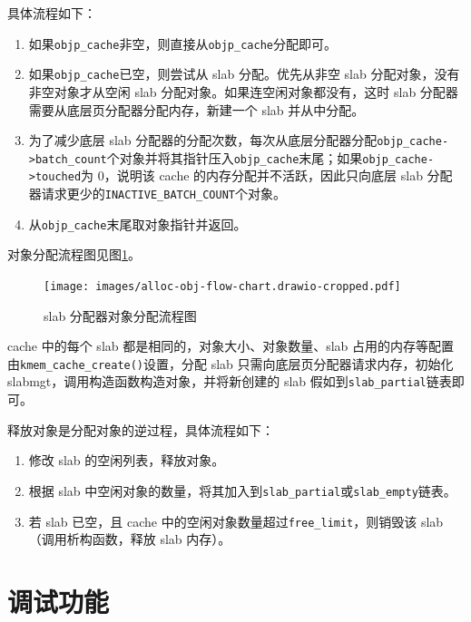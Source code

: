 \documentclass[AutoFakeBold]{LZUThesis}
\begin{document}
\begin{sloppypar}
具体流程如下：

\begin{enumerate}
\def\labelenumi{\arabic{enumi}.}
\item
  如果\texttt{objp\_cache}非空，则直接从\texttt{objp\_cache}分配即可。
\item
  如果\texttt{objp\_cache}已空，则尝试从 slab 分配。优先从非空 slab
  分配对象，没有非空对象才从空闲 slab
  分配对象。如果连空闲对象都没有，这时 slab
  分配器需要从底层页分配器分配内存，新建一个 slab 并从中分配。
\item
  为了减少底层 slab
  分配器的分配次数，每次从底层分配器分配\texttt{objp\_cache-\textgreater{}batch\_count}个对象并将其指针压入\texttt{objp\_cache}末尾；如果\texttt{objp\_cache-\textgreater{}touched}为
  0，说明该 cache 的内存分配并不活跃，因此只向底层 slab
  分配器请求更少的\texttt{INACTIVE\_BATCH\_COUNT}个对象。
\item
  从\texttt{objp\_cache}末尾取对象指针并返回。
\end{enumerate}

对象分配流程图见图\ref{figure:slab-allocator-obj-alloc-flow-chart}。

\begin{figure}
\centering
\texttt{[image: images/alloc-obj-flow-chart.drawio-cropped.pdf]}
\caption{slab 分配器对象分配流程图}
\label{figure:slab-allocator-obj-alloc-flow-chart}
\end{figure}

cache 中的每个 slab 都是相同的，对象大小、对象数量、slab
占用的内存等配置由\texttt{kmem\_cache\_create()}设置，分配 slab
只需向底层页分配器请求内存，初始化
slabmgt，调用构造函数构造对象，并将新创建的 slab
假如到\texttt{slab\_partial}链表即可。

释放对象是分配对象的逆过程，具体流程如下：

\begin{enumerate}
\def\labelenumi{\arabic{enumi}.}
\item
  修改 slab 的空闲列表，释放对象。
\item
  根据 slab
  中空闲对象的数量，将其加入到\texttt{slab\_partial}或\texttt{slab\_empty}链表。
\item
  若 slab 已空，且 cache
  中的空闲对象数量超过\texttt{free\_limit}，则销毁该
  slab（调用析构函数，释放 slab 内存）。
\end{enumerate}


\section{调试功能}


\end{sloppypar}
\end{document}
